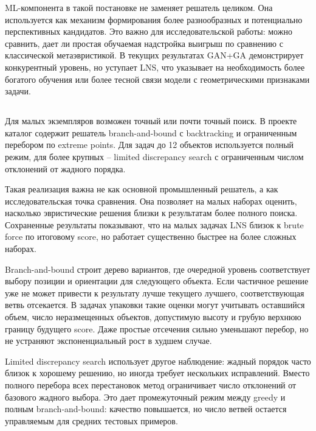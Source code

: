 ML-компонента в такой постановке не заменяет решатель целиком. Она используется как механизм формирования более разнообразных и потенциально перспективных кандидатов. Это важно для исследовательской работы: можно сравнить, дает ли простая обучаемая надстройка выигрыш по сравнению с классической метаэвристикой. В текущих результатах GAN+GA демонстрирует конкурентный уровень, но уступает LNS, что указывает на необходимость более богатого обучения или более тесной связи модели с геометрическими признаками задачи.

\subsection{}

Для малых экземпляров возможен точный или почти точный поиск. В проекте каталог  содержит решатель branch-and-bound с backtracking и ограниченным перебором по extreme points. Для задач до 12 объектов используется полный режим, для более крупных -- limited discrepancy search с ограниченным числом отклонений от жадного порядка.

Такая реализация важна не как основной промышленный решатель, а как исследовательская точка сравнения. Она позволяет на малых наборах оценить, насколько эвристические решения близки к результатам более полного поиска. Сохраненные результаты показывают, что на малых задачах LNS близок к brute force по итоговому score, но работает существенно быстрее на более сложных наборах.

Branch-and-bound строит дерево вариантов, где очередной уровень соответствует выбору позиции и ориентации для следующего объекта. Если частичное решение уже не может привести к результату лучше текущего лучшего, соответствующая ветвь отсекается. В задачах упаковки такие оценки могут учитывать оставшийся объем, число неразмещенных объектов, допустимую высоту и грубую верхнюю границу будущего score. Даже простые отсечения сильно уменьшают перебор, но не устраняют экспоненциальный рост в худшем случае.

Limited discrepancy search использует другое наблюдение: жадный порядок часто близок к хорошему решению, но иногда требует нескольких исправлений. Вместо полного перебора всех перестановок метод ограничивает число отклонений от базового жадного выбора. Это дает промежуточный режим между greedy и полным branch-and-bound: качество повышается, но число ветвей остается управляемым для средних тестовых примеров.

